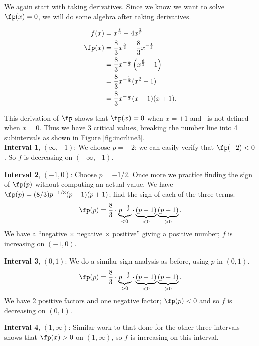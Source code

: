 {We again start with taking derivatives. Since we know we want to solve $\fp(x) = 0$, we will do some algebra after taking derivatives.

\begin{align*}
f(x) &= x^{\frac{8}{3}}-4x^{\frac{2}{3}} \\
\fp(x) &= \frac83 x^{\frac53} - \frac83x^{-\frac13}\\
	&= \frac83x^{-\frac13}\left(x^{\frac63}-1\right)\\
	&=\frac83x^{-\frac13}(x^2-1)\\
	&=\frac83x^{-\frac13}(x-1)(x+1).
\end{align*}

This derivation of $\fp$ shows that $\fp(x) = 0$ when $x=\pm 1$ and \fp\ is not defined when $x=0$. Thus we have 3 critical values, breaking the number line into 4 subintervals as shown in Figure \ref{fig:incrline3}.\\


\noindent\textbf{Interval 1}, $(\infty,-1)$: We choose $p=-2$; we can easily verify that $\fp(-2)<0$. So $f$ is decreasing on $(-\infty,-1)$.

\noindent\textbf{Interval 2}, $(-1,0)$: Choose $p=-1/2$. Once more we practice finding the sign of $\fp(p)$ without computing an actual value. We have $\fp(p) = (8/3)p^{-1/3}(p-1)(p+1)$; find the sign of each of the three terms. 
\[
\fp(p) = \frac 83 \cdot \underbrace{p^{-\frac13}}_{<0}\cdot \underbrace{(p-1)}_{<0}\underbrace{(p+1)}_{>0}.
\]
We have a ``negative $\times$ negative $\times$ positive'' giving a positive number; $f$ is increasing on $(-1,0)$.
		
\noindent\textbf{Interval 3}, $(0,1)$: We do a similar sign analysis as before, using $p$ in $(0,1)$.
\[
\fp(p) = \frac 83 \cdot \underbrace{p^{-\frac13}}_{>0}\cdot \underbrace{(p-1)}_{<0}\underbrace{(p+1)}_{>0}.
\]
We have 2 positive factors and one negative factor; $\fp(p)<0$ and so $f$ is decreasing on $(0,1)$.
		
\noindent\textbf{Interval 4}, $(1,\infty)$: Similar work to that done for the other three intervals shows that $\fp(x)>0$ on $(1,\infty)$, so $f$ is increasing on this interval.\\

}
